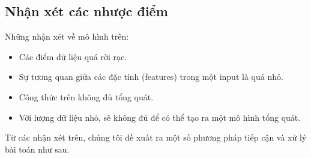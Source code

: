 \documentclass[12pt]{report}
\begin{document}
\subsection{Nhận xét các nhược điểm} %
\label{sub:nhận_xét_các_nhược_điểm}
\begin{flushleft}
	Những nhận xét về mô hình trên:
	\begin{itemize}
		\item Các điểm dữ liệu quá rời rạc.
		\item Sự tương quan giữa các đặc tính (features) trong một input là quá nhỏ.
		\item Công thức trên không đủ tổng quát.
		\item Với lượng dữ liệu nhỏ, sẽ không đủ để có thể tạo ra một mô hình tổng quát.
	\end{itemize}

	Từ các nhận xét trên, chúng tôi đề xuất ra một số phương pháp tiếp cận và xử lý bài toán như sau.
\end{flushleft}
\end{document}
